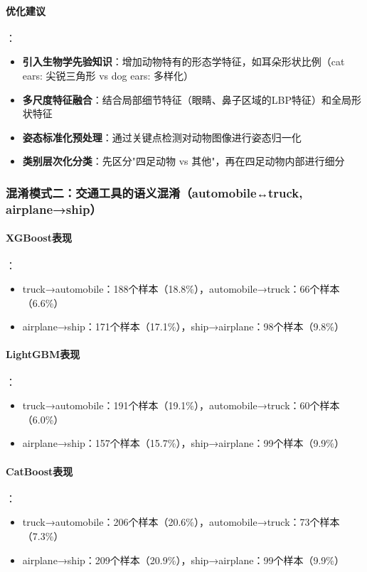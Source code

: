 \documentclass[UTF8]{report}
\theoremstyle{MyLineTheoremStyle} %
\theoremstyle{MyBlockTheoremStyle} %
\theoremstyle{MySubsubsectionStyle} %
\begin{document}
\paragraph{优化建议}：
\begin{itemize}
    \item \textbf{引入生物学先验知识}：增加动物特有的形态学特征，如耳朵形状比例（cat ears: 尖锐三角形 vs dog ears: 多样化）
    \item \textbf{多尺度特征融合}：结合局部细节特征（眼睛、鼻子区域的LBP特征）和全局形状特征
    \item \textbf{姿态标准化预处理}：通过关键点检测对动物图像进行姿态归一化
    \item \textbf{类别层次化分类}：先区分"四足动物 vs 其他"，再在四足动物内部进行细分
\end{itemize}

\subsubsection{混淆模式二：交通工具的语义混淆（automobile↔truck, airplane→ship）}
\paragraph{XGBoost表现}：
\begin{itemize}
    \item truck→automobile：188个样本（18.8\%），automobile→truck：66个样本（6.6\%）
    \item airplane→ship：171个样本（17.1\%），ship→airplane：98个样本（9.8\%）
\end{itemize}
\paragraph{LightGBM表现}：
\begin{itemize}
    \item truck→automobile：191个样本（19.1\%），automobile→truck：60个样本（6.0\%）
    \item airplane→ship：157个样本（15.7\%），ship→airplane：99个样本（9.9\%）
\end{itemize}
\paragraph{CatBoost表现}：
\begin{itemize}
    \item truck→automobile：206个样本（20.6\%），automobile→truck：73个样本（7.3\%）
    \item airplane→ship：209个样本（20.9\%），ship→airplane：99个样本（9.9\%）
\end{itemize}
\end{document}
